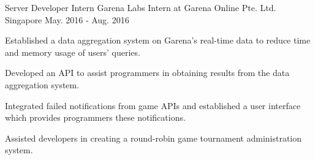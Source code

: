 

\begin{cventries}

	\cventry
	{Server Developer Intern} %
	{Garena Labs Intern at Garena Online Pte. Ltd.} %
	{Singapore} %
	{May. 2016 - Aug. 2016} %
	{
		\begin{cvitems} %
		\item {Established a data aggregation system on Garena's real-time data to reduce time and memory usage of users' queries.}
		\item {Developed an API to assist programmers in obtaining results from the data aggregation system.}
		\item {Integrated failed notifications from game APIs and established a user interface which provides programmers these notifications.}
		\item {Assisted developers in creating a round-robin game tournament administration system.}
		\end{cvitems}
	}

\end{cventries}
